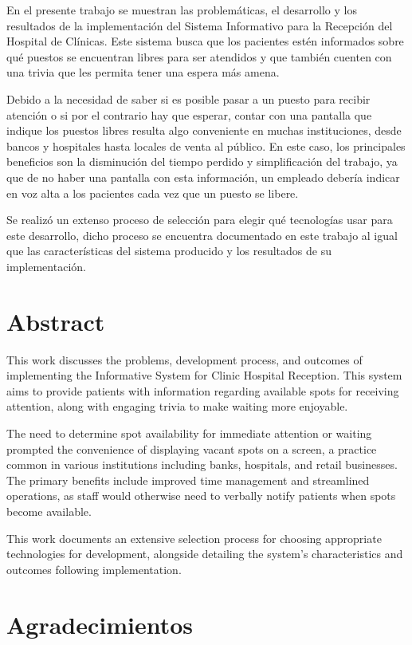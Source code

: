 \documentclass[twoside]{article}
\begin{document}
En el presente trabajo se muestran las problemáticas, el desarrollo y los resultados de la implementación del Sistema Informativo para la Recepción del Hospital de Clínicas. Este sistema busca que los pacientes estén informados sobre qué puestos se encuentran libres para ser atendidos y que también cuenten con una trivia que les permita tener una espera más amena.

Debido a la necesidad de saber si es posible pasar a un puesto para recibir atención o si por el contrario hay que esperar, contar con una pantalla que indique los puestos libres resulta algo conveniente en muchas instituciones, desde bancos y hospitales hasta locales de venta al público. En este caso, los principales beneficios son la disminución del tiempo perdido y simplificación del trabajo, ya que de no haber una pantalla con esta información, un empleado debería indicar en voz alta a los pacientes cada vez que un puesto se libere.

Se realizó un extenso proceso de selección para elegir qué tecnologías usar para este desarrollo, dicho proceso se encuentra documentado en este trabajo al igual que las características del sistema producido y los resultados de su implementación.

\section*{Abstract}

This work discusses the problems, development process, and outcomes of implementing the Informative System for Clinic Hospital Reception. This system aims to provide patients with information regarding available spots for receiving attention, along with engaging trivia to make waiting more enjoyable.

The need to determine spot availability for immediate attention or waiting prompted the convenience of displaying vacant spots on a screen, a practice common in various institutions including banks, hospitals, and retail businesses. The primary benefits include improved time management and streamlined operations, as staff would otherwise need to verbally notify patients when spots become available. 

This work documents an extensive selection process for choosing appropriate technologies for development, alongside detailing the system's characteristics and outcomes following implementation.
\newpage
\
\newpage
\section*{Agradecimientos}
\end{document}
